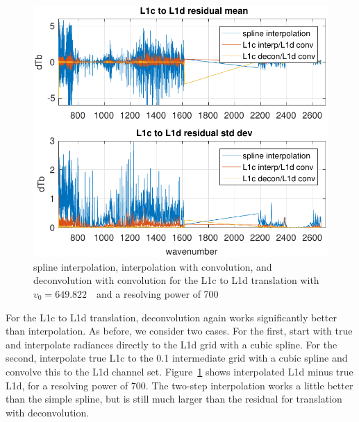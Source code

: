 \documentclass[10pt,twocolumn]{article}
\begin{document}
\begin{figure} %
  \centering
  \includegraphics[width=\linewidth]{figures/CtoD_interp_diff.pdf}
  \caption{spline interpolation, interpolation with convolution, 
    and deconvolution with convolution for the {\airs} L1c to L1d
    translation with $v_0=649.822$~\wn\ and a resolving power of 700}
  \label{interpL1d}
\end{figure}

For the {\airs} L1c to L1d translation, deconvolution again works
significantly better than interpolation.  As before, we consider two
cases.  For the first, start with true {\airs} and interpolate
radiances directly to the L1d grid with a cubic spline.  For the
second, interpolate true L1c to the 0.1 {\wn} intermediate grid with
a cubic spline and convolve this to the L1d channel set.
Figure~\ref{interpL1d} shows interpolated L1d minus true L1d, for a
resolving power of 700.  The two-step interpolation works a little
better than the simple spline, but is still much larger than the
residual for translation with deconvolution.



\end{document}
